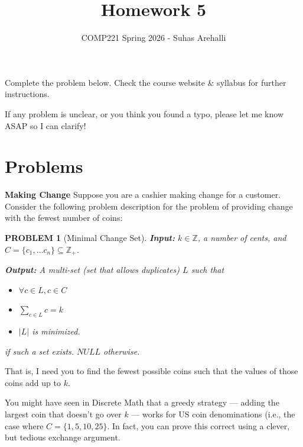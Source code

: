 \documentclass{exam}
\title{Homework 5}
\author{COMP221 Spring 2026 - Suhas Arehalli}
\date{}
\theoremstyle{prob}
\newtheorem*{probstate}{PROBLEM}
\begin{document}
\maketitle

Complete the problem below. Check the course website \& syllabus for further instructions.

If any problem is unclear, or you think you found a typo, please let me know ASAP so I can clarify!

\section*{Problems}

\begin{questions}
    \question \textbf{Making Change} 
    Suppose you are a cashier making change for a customer. Consider the following problem description for the problem of providing change with the fewest number of coins:
    \begin{probstate}[Minimal Change Set]
        \textbf{Input:} $k \in \mathbb{Z}$, a number of cents, and $C = \{c_1, \dots c_n\} \subseteq \mathbb{Z}_+$. 
        
        \textbf{Output:} A multi-set (set that allows duplicates) $L$ such that 
        \begin{itemize}
            \item $\forall c \in L, c \in C$
            \item $\sum_{c \in L} c = k$
            \item $\lvert L \rvert$ is minimized.
        \end{itemize}
        if such a set exists. $NULL$ otherwise.
    \end{probstate}
    That is, I need you to find the fewest possible coins such that the values of those coins add up to $k$. 

    You might have seen in Discrete Math that a greedy strategy --- adding the largest coin that doesn't go over $k$ --- works for US coin denominations (i.e., the case where $C = \{1, 5, 10, 25\}$. In fact, you can prove this correct using a clever, but tedious exchange argument.
\end{questions}
\end{document}
